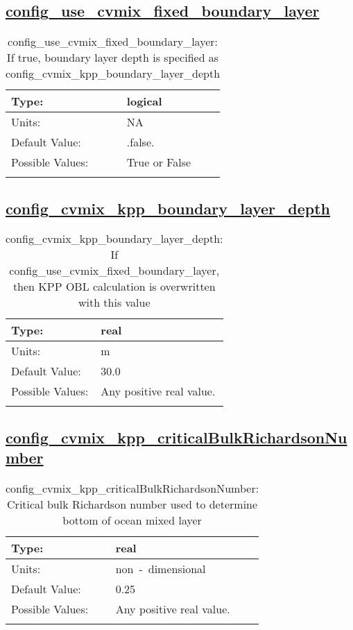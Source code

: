 \subsection[config\_use\_cvmix\_fixed\_boundary\_layer]{\hyperref[sec:nm_tab_cvmix]{config\_use\_cvmix\_fixed\_boundary\_layer}}
\label{subsec:nm_sec_config_use_cvmix_fixed_boundary_layer}
\begin{center}
\begin{longtable}{| p{2.0in} || p{4.0in} |}
    \hline
    Type: & logical \\
    \hline
    Units: & \si{NA} \\
    \hline
    Default Value: & .false. \\
    \hline
    Possible Values: & True or False \\
    \hline
    \caption{config\_use\_cvmix\_fixed\_boundary\_layer: If true, boundary layer depth is specified as config\_cvmix\_kpp\_boundary\_layer\_depth}
\end{longtable}
\end{center}
\subsection[config\_cvmix\_kpp\_boundary\_layer\_depth]{\hyperref[sec:nm_tab_cvmix]{config\_cvmix\_kpp\_boundary\_layer\_depth}}
\label{subsec:nm_sec_config_cvmix_kpp_boundary_layer_depth}
\begin{center}
\begin{longtable}{| p{2.0in} || p{4.0in} |}
    \hline
    Type: & real \\
    \hline
    Units: & \si{m} \\
    \hline
    Default Value: & 30.0 \\
    \hline
    Possible Values: & Any positive real value. \\
    \hline
    \caption{config\_cvmix\_kpp\_boundary\_layer\_depth: If config\_use\_cvmix\_fixed\_boundary\_layer, then KPP OBL calculation is overwritten with this value}
\end{longtable}
\end{center}
\subsection[config\_cvmix\_kpp\_criticalBulkRichardsonNumber]{\hyperref[sec:nm_tab_cvmix]{config\_cvmix\_kpp\_criticalBulkRichardsonNumber}}
\label{subsec:nm_sec_config_cvmix_kpp_criticalBulkRichardsonNumber}
\begin{center}
\begin{longtable}{| p{2.0in} || p{4.0in} |}
    \hline
    Type: & real \\
    \hline
    Units: & \si{non-dimensional} \\
    \hline
    Default Value: & 0.25 \\
    \hline
    Possible Values: & Any positive real value. \\
    \hline
    \caption{config\_cvmix\_kpp\_criticalBulkRichardsonNumber: Critical bulk Richardson number used to determine bottom of ocean mixed layer}
\end{longtable}
\end{center}
